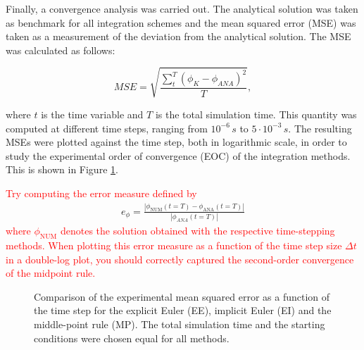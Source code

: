 \documentclass[12pt,bibstyle=none,pagenumberinfooter]{ifmdocument}
\begin{document}
Finally, a convergence analysis was carried out. The analytical solution was taken as benchmark for all integration schemes and the mean squared error (MSE) was taken as a measurement of the deviation from the analytical solution. The MSE was calculated as follows:

\begin{equation}
    MSE = \sqrt{\frac{\displaystyle \sum_{t}^T \left(\phi_{K} - \phi_{ANA}\right)^2}{T}},
    \label{eq: MSE}
\end{equation}

where $t$ is the time variable and $T$ is the total simulation time. This quantity was computed at different time steps, ranging from $10^{-6} \, s$ to $5\cdot 10^{-3} \,s$. The resulting MSEs were plotted against the time step, both in logarithmic scale, in order to study the experimental order of convergence (EOC) of the integration methods. This is shown in Figure \ref{fig: ConvergencePlot}.

\textcolor{red}{Try computing the error measure defined by}
\begin{align}
    e_\phi = \frac{| \phi_\mathrm{NUM}(t=T) - \phi_\mathrm{ANA}(t=T)| }{| \phi_{ANA}(t=T)|}
\end{align}
\textcolor{red}{where $\phi_\mathrm{NUM}$ denotes the solution obtained with the respective time-stepping methods. When plotting this error measure as a function of the time step size $\Delta t$ in a double-log plot, you should correctly captured the second-order convergence of the midpoint rule.}

\begin{figure}[h]
    \centering
    \setlength{\figH}{0.3\textheight}
    \setlength{\figW}{0.6\textwidth}
    
    \caption{Comparison  of the experimental mean squared error as a function of the time step for the explicit Euler (EE), implicit Euler (EI) and the middle-point rule (MP). The total simulation time and the starting conditions were chosen equal for all methods.}
    \label{fig: ConvergencePlot}
\end{figure}
\end{document}
